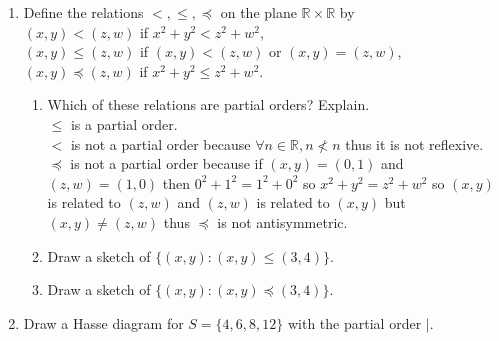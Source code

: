 \documentclass[11pt]{article}
\newcommand{\R}{\mathbb{R}}
\begin{document}
\begin{enumerate}
\begin{enumerate}
	\end{enumerate}
\setcounter{enumi}{14}
\item Define the relations $<,\leq,\preceq$ on the plane $\R\times\R$ by\\
$(x,y)<(z,w)$ if $x^2+y^2<z^2+w^2$,\\
$(x,y)\leq(z,w)$ if $(x,y)<(z,w)$ or $(x,y)=(z,w)$,\\
$(x,y)\preceq(z,w)$ if $x^2+y^2\leq z^2+w^2$.
	\begin{enumerate}
	\item Which of these relations are partial orders? Explain.\\
	$\leq$ is a partial order.\\
	$<$ is not a partial order because $\forall n\in\R,n\not<n$ thus it is not reflexive.\\
	$\preceq$ is not a partial order because if $(x,y)=(0,1)$ and $(z,w)=(1,0)$ then $0^2+1^2=1^2+0^2$ so $x^2+y^2 = z^2+w^2$ so 		$(x,y)$ is related to $(z,w)$ and $(z,w)$ is related to $(x,y)$ but $(x,y)\not=(z,w)$ thus $\preceq$ is not antisymmetric.
	\setcounter{enumii}{2}
	\item Draw a sketch of $\{(x,y):(x,y)\leq (3,4)\}$.\\
	\item Draw a sketch of $\{(x,y):(x,y)\preceq (3,4)\}$.\\
	\end{enumerate}
\setcounter{enumi}{0}
\item Draw a Hasse diagram for $S=\{4,6,8,12\}$ with the partial order $\mid$.\\
\end{enumerate}
\end{document}

